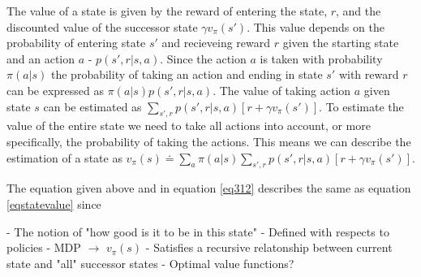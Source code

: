 \documentclass[11pt]{article}
\begin{document}
The value of a state is given by the reward of entering the state, $r$, and the discounted value of the successor state
$\gamma v_\pi(s')$.
This value depends on the probability of entering state $s'$ and recieveing reward $r$ given
the starting state and an action $a$ - $p(s', r | s, a)$.
Since the action $a$ is taken with probability $\pi(a|s)$ the probability of taking an action and ending in state $s'$ with reward $r$
can be expressed as $\pi(a|s) p(s', r | s, a)$.
The value of taking action $a$ given state $s$ can be estimated as $\sum\limits_{s',r} p(s',r|s,a)\left [r + \gamma v_\pi(s') \right ]$.
To estimate the value of the entire state we need to take all actions into account, or more specifically,
the probability of taking the actions.
This means we can describe the estimation of a state as
$
v_\pi(s)  \doteq \sum\limits_a \pi(a|s) \sum\limits_{s',r}p(s',r|s, a)\left [r + \gamma v_\pi(s') \right ]
$.

The equation given above and in equation \ref{eq312} describes the same as equation \ref{eqstatevalue} since


- The notion of "how good is it to be in this state"
- Defined with respects to policies
- MDP $\rightarrow$ $v_\pi(s)$
- Satisfies a recursive relatonship between current state and "all" successor states
- Optimal value functions?


%
%
\end{document}
